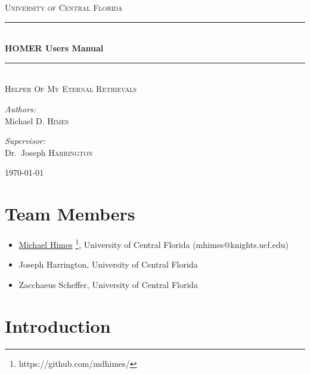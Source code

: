 \documentclass[letterpaper, 12pt]{article}
\begin{document}
\begin{titlepage}
\begin{center}

\textsc{\LARGE University of Central Florida}\\[1.5cm]

\rule{\linewidth}{0.5mm} \\[0.4cm]
{ \huge \bfseries HOMER Users Manual \\[0.4cm] }
\rule{\linewidth}{0.5mm} \\[1.0cm]

\textsc{\Large Helper Of My Eternal Retrievals}\\[1.5cm]

\noindent
\begin{minipage}{0.4\textwidth}
\begin{flushleft}
\large
\emph{Authors:} \\
Michael D. \textsc{Himes} \\
\end{flushleft}
\end{minipage}%
\begin{minipage}{0.4\textwidth}
\begin{flushright} \large
\emph{Supervisor:} \\
Dr.~Joseph \textsc{Harrington}
\end{flushright}
\end{minipage}
\vfill

{\large \today}

\end{center}
\end{titlepage}

\tableofcontents
\newpage

\section{Team Members}
\label{sec:team}

\begin{itemize}
\item \href{https://github.com/mdhimes/}{Michael Himes}%
  \footnote{https://github.com/mdhimes/}, University of
  Central Florida (mhimes@knights.ucf.edu)
\item Joseph Harrington, University of Central Florida
\item Zacchaeus Scheffer, University of Central Florida
\end{itemize}

\section{Introduction}
\label{sec:theory}
\end{document}
